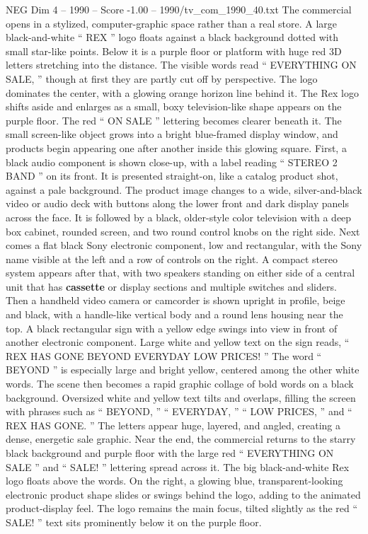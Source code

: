 \begin{textsample}{NEG Dim 4 – 1990 – Score -1.00 – 1990/tv\_com\_1990\_40.txt}  \label{ex:f4_neg_027}
The commercial opens in a stylized, computer-graphic space rather than a real store.
A large black-and-white “ REX ” logo floats against a black background dotted with small star-like points.
Below it is a purple floor or platform with huge red 3D letters stretching into the distance.
The visible words read “ EVERYTHING ON SALE, ” though at first they are partly cut off by perspective.
The logo dominates the center, with a glowing orange horizon line behind it.
The Rex logo shifts aside and enlarges as a small, boxy television-like shape appears on the purple floor.
The red “ ON SALE ” lettering becomes clearer beneath it.
The small screen-like object grows into a bright blue-framed display window, and products begin appearing one after another inside this glowing square.
First, a black audio component is shown close-up, with a label reading “ STEREO 2 BAND ” on its front.
It is presented straight-on, like a catalog product shot, against a pale background.
The product image changes to a wide, silver-and-black video or audio deck with buttons along the lower front and dark display panels across the face.
It is followed by a black, older-style color television with a deep box cabinet, rounded screen, and two round control knobs on the right side.
Next comes a flat black Sony electronic component, low and rectangular, with the Sony name visible at the left and a row of controls on the right.
A compact stereo system appears after that, with two speakers standing on either side of a central unit that has \textbf{cassette} or display sections and multiple switches and sliders.
Then a handheld video camera or camcorder is shown upright in profile, beige and black, with a handle-like vertical body and a round lens housing near the top.
A black rectangular sign with a yellow edge swings into view in front of another electronic component.
Large white and yellow text on the sign reads, “ REX HAS GONE BEYOND EVERYDAY LOW PRICES! ” The word “ BEYOND ” is especially large and bright yellow, centered among the other white words.
The scene then becomes a rapid graphic collage of bold words on a black background.
Oversized white and yellow text tilts and overlaps, filling the screen with phrases such as “ BEYOND, ” “ EVERYDAY, ” “ LOW PRICES, ” and “ REX HAS GONE. ” The letters appear huge, layered, and angled, creating a dense, energetic sale graphic.
Near the end, the commercial returns to the starry black background and purple floor with the large red “ EVERYTHING ON SALE ” and “ SALE! ” lettering spread across it.
The big black-and-white Rex logo floats above the words.
On the right, a glowing blue, transparent-looking electronic product shape slides or swings behind the logo, adding to the animated product-display feel.
The logo remains the main focus, tilted slightly as the red “ SALE! ” text sits prominently below it on the purple floor.

\end{textsample}
